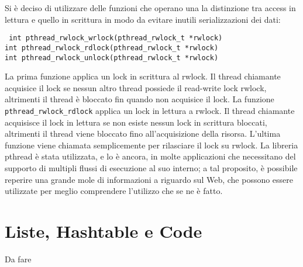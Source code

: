 Si è deciso di utilizzare delle funzioni che operano una la distinzione tra access in lettura e quello in scrittura in modo da evitare inutili serializzazioni dei dati:
\begin{center}
\texttt{
int pthread\_rwlock\_wrlock(pthread\_rwlock\_t *rwlock)\\
int pthread\_rwlock\_rdlock(pthread\_rwlock\_t *rwlock)\\
int pthread\_rwlock\_unlock(pthread\_rwlock\_t *rwlock)}
\end{center}
La prima funzione applica un lock in scrittura al rwlock. Il thread chiamante acquisice il lock se nessun altro thread possiede il read-write lock rwlock, altrimenti il thread è bloccato fin quando non acquisice il lock. La funzione \texttt{pthread\_rwlock\_rdlock} applica un lock in lettura a rwlock. Il thread chiamante acquisisce il lock in lettura se non esiste nessun lock in scrittura bloccati, altrimenti il thread viene bloccato fino all’acquisizione della risorsa. L’ultima funzione viene chiamata semplicemente per rilasciare il lock su rwlock.
La libreria pthread è stata utilizzata, e lo è ancora, in molte applicazioni che necessitano del supporto di multipli flussi di esecuzione al suo interno; a tal proposito, è possibile reperire una grande mole di informazioni a riguardo sul Web, che possono essere utilizzate per meglio comprendere l’utilizzo che se ne è fatto.
\section{Liste, Hashtable e Code}
Da fare